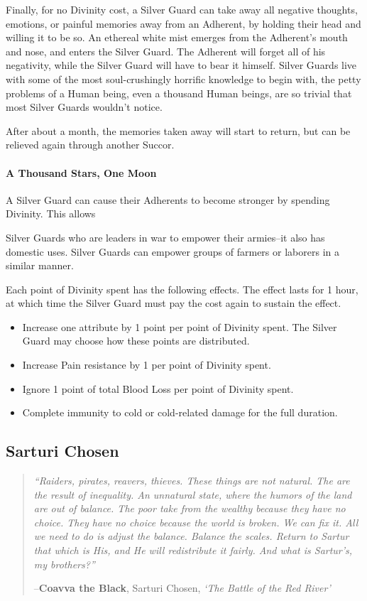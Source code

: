 \documentclass[oneside,11pt,english]{book}
\begin{document}
Finally, for no Divinity cost, a Silver Guard can take away all negative thoughts, emotions, or 
painful memories away from an Adherent, by holding their head and willing it to be so. An 
ethereal white mist emerges from the Adherent's mouth and nose, and enters the Silver Guard. 
The Adherent will forget all of his negativity, while the Silver Guard will have to bear it himself. 
Silver Guards live with some of the most soul-crushingly horrific knowledge to begin with, the 
petty problems of a Human being, even a thousand Human beings, are so trivial that most Silver 
Guards wouldn't notice. 

After about a month, the memories taken away will start to return, but can be relieved again 
through another Succor. 

\paragraph{A Thousand Stars, One Moon}
A Silver Guard can cause their Adherents to become stronger by spending Divinity. This allows 


Silver Guards who are leaders in war to empower their armies--it also has domestic uses. Silver 
Guards can empower groups of farmers or laborers in a similar manner. 


Each point of Divinity spent has the following effects. The effect lasts for 1 hour, at which time 
the Silver Guard must pay the cost again to sustain the effect. 
\begin{itemize}
\item Increase one attribute by 1 point per point of Divinity spent. The Silver Guard may 
choose how these points are distributed. 
\item Increase Pain resistance by 1 per point of Divinity spent. 
\item Ignore 1 point of total Blood Loss per point of Divinity spent. 
\item Complete immunity to cold or cold-related damage for the full duration. 
\end{itemize}
\subsection{Sarturi Chosen}
\begin{quotation}
	{\emph{“Raiders, pirates, reavers, thieves. These things are not natural. The are the result of inequality. An unnatural state, where the humors of the land are out of balance. The poor take from the wealthy because they have no choice. They have no choice because the world is broken. We can fix it. All we need to do is adjust the balance. Balance the scales. Return to Sartur that which is His, and He will redistribute it fairly. And what is Sartur’s, my brothers?”}

\hfill--\textbf{Coavva the Black}, Sarturi Chosen, \textit{‘The Battle of the Red River’}}
\end{quotation}
\end{document}
